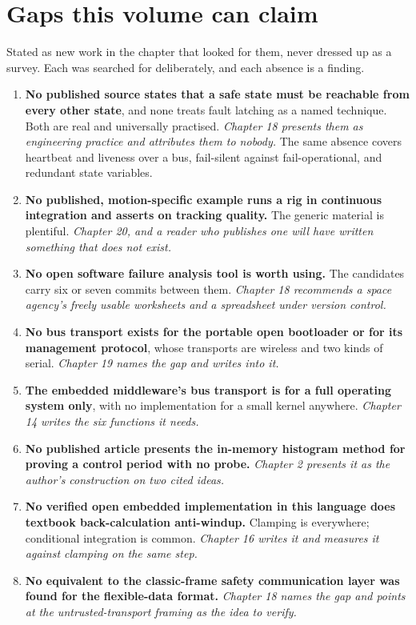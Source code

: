 \section{Gaps this volume can claim}

Stated as new work in the chapter that looked for them, never dressed up as a
survey. Each was searched for deliberately, and each absence is a finding.

\begin{enumerate}[itemsep=3pt]
\item \textbf{No published source states that a safe state must be reachable
from every other state}, and none treats fault latching as a named technique.
Both are real and universally practised. \emph{Chapter 18 presents them as
engineering practice and attributes them to nobody.} The same absence covers
heartbeat and liveness over a bus, fail-silent against fail-operational, and
redundant state variables.
\item \textbf{No published, motion-specific example runs a rig in continuous
integration and asserts on tracking quality.} The generic material is plentiful.
\emph{Chapter 20, and a reader who publishes one will have written something
that does not exist.}
\item \textbf{No open software failure analysis tool is worth using.} The
candidates carry six or seven commits between them. \emph{Chapter 18 recommends
a space agency's freely usable worksheets and a spreadsheet under version
control.}
\item \textbf{No bus transport exists for the portable open bootloader or for
its management protocol}, whose transports are wireless and two kinds of serial.
\emph{Chapter 19 names the gap and writes into it.}
\item \textbf{The embedded middleware's bus transport is for a full operating
system only}, with no implementation for a small kernel anywhere. \emph{Chapter
14 writes the six functions it needs.}
\item \textbf{No published article presents the in-memory histogram method for
proving a control period with no probe.} \emph{Chapter 2 presents it as the
author's construction on two cited ideas.}
\item \textbf{No verified open embedded implementation in this language does
textbook back-calculation anti-windup.} Clamping is everywhere; conditional
integration is common. \emph{Chapter 16 writes it and measures it against
clamping on the same step.}
\item \textbf{No equivalent to the classic-frame safety communication layer was
found for the flexible-data format.} \emph{Chapter 18 names the gap and points
at the untrusted-transport framing as the idea to verify.}
\end{enumerate}

